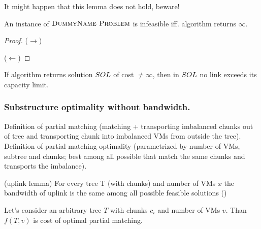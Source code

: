 It might happen that this lemma does not hold, beware!

\begin{lemma}
An instance of $\textsc{DummyName Problem}$ is infeasible iff. algorithm returns $\infty$.
\end{lemma}
\begin{proof}
  ($\rightarrow$)

  ($\leftarrow$)
  \end{proof}

\begin{lemma}
  If algorithm returns solution $SOL$ of cost $\neq \infty$, then in $SOL$ no link exceeds its capacity limit.
  \end{lemma}

\subsubsection{Substructure optimality without bandwidth.}

Definition of partial matching (matching + transporting imbalanced chunks out of tree and transporting chunk into imbalanced VMs from outside the tree). Definition of partial matching optimality (parametrized by number of VMs, subtree and chunks; best among all possible that match the same chunks and transports the imbalance).

\begin{lemma}
(uplink lemma)
For every tree T (with chunks) and number of VMs $x$ the bandwidth of uplink is the same among all possible feasible solutions ()

\end{lemma}

\begin{lemma}

Let's consider an arbitrary tree $T$ with chunks $c_i$ and number of VMs $v$. Than $f(T, v)$ is cost of optimal partial matching.

\end{lemma}


